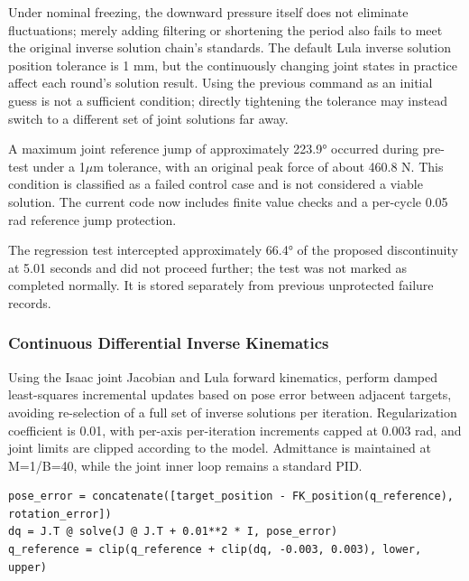 Under nominal freezing, the downward pressure itself does not eliminate fluctuations; merely adding filtering or shortening the period also fails to meet the original inverse solution chain's standards. The default Lula inverse solution position tolerance is 1 mm, but the continuously changing joint states in practice affect each round's solution result. Using the previous command as an initial guess is not a sufficient condition; directly tightening the tolerance may instead switch to a different set of joint solutions far away.

A maximum joint reference jump of approximately 223.9° occurred during pre-test under a 1\(\mu\)m tolerance, with an original peak force of about 460.8 N. This condition is classified as a failed control case and is not considered a viable solution. The current code now includes finite value checks and a per-cycle 0.05 rad reference jump protection.

The regression test intercepted approximately 66.4° of the proposed discontinuity at 5.01 seconds and did not proceed further; the test was not marked as completed normally. It is stored separately from previous unprotected failure records.


\subsubsection{Continuous Differential Inverse Kinematics}\label{s12-detail-4}

Using the Isaac joint Jacobian and Lula forward kinematics, perform damped least-squares incremental updates based on pose error between adjacent targets, avoiding re-selection of a full set of inverse solutions per iteration. Regularization coefficient is 0.01, with per-axis per-iteration increments capped at 0.003 rad, and joint limits are clipped according to the model. Admittance is maintained at M=1/B=40, while the joint inner loop remains a standard PID.

\begin{Verbatim}[breaklines=true,breakanywhere=true,fontsize=\footnotesize]
pose_error = concatenate([target_position - FK_position(q_reference), rotation_error])
dq = J.T @ solve(J @ J.T + 0.01**2 * I, pose_error)
q_reference = clip(q_reference + clip(dq, -0.003, 0.003), lower, upper)
\end{Verbatim}

